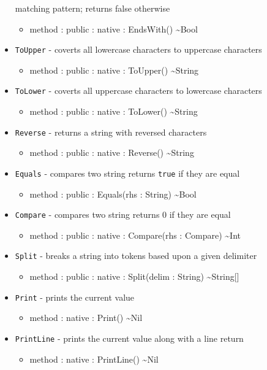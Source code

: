 \documentclass[11pt]{article}
\begin{document}
\begin{itemize}
  matching pattern; returns false otherwise
  \begin{itemize}
  \item method : public : native : EndsWith() \textasciitilde Bool
  \end{itemize}
\item \texttt{ToUpper} - coverts all lowercase characters to uppercase
  characters
  \begin{itemize}
  \item method : public : native : ToUpper() \textasciitilde String
  \end{itemize}
\item \texttt{ToLower} - coverts all uppercase characters to lowercase
  characters
  \begin{itemize}
  \item method : public : native : ToLower() \textasciitilde String
  \end{itemize}
\item \texttt{Reverse} - returns a string with reversed characters
  \begin{itemize}
  \item method : public : native : Reverse() \textasciitilde String
  \end{itemize}
\item \texttt{Equals} - compares two string returns \texttt{true} if
  they are equal
  \begin{itemize}
  \item method : public : Equals(rhs : String) \textasciitilde Bool
  \end{itemize}
\item \texttt{Compare} - compares two string returns 0 if they are
  equal
  \begin{itemize}
  \item method : public : native : Compare(rhs : Compare)
    \textasciitilde Int
  \end{itemize}
\item \texttt{Split} - breaks a string into tokens based upon a given
  delimiter
  \begin{itemize}
  \item method : public : native : Split(delim : String)
    \textasciitilde String[]
  \end{itemize}
\item \texttt{Print} - prints the current value
  \begin{itemize}
  \item method : native : Print() \textasciitilde Nil
  \end{itemize}
\item \texttt{PrintLine} - prints the current value along with a line
  return
  \begin{itemize}
  \item method : native : PrintLine() \textasciitilde Nil
  \end{itemize}
\end{itemize}
\end{document}
